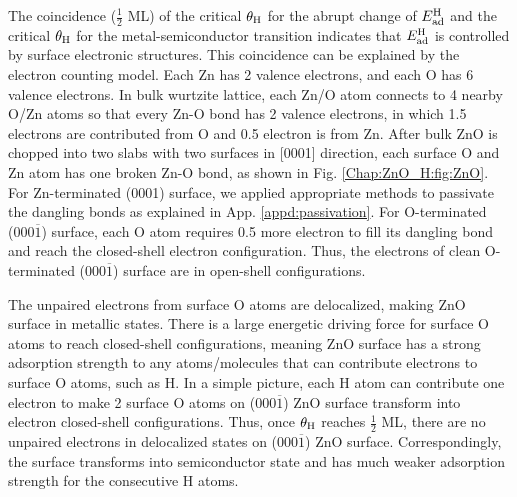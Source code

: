 The coincidence ($\frac{1}{2}$ ML) of the critical $\theta_{\textup{H}}$ for the abrupt change of $E_{\textup{ad}}^{\textup{H}}$ and the critical $\theta_{\textup{H}}$ for the metal-semiconductor transition indicates that $E_{\textup{ad}}^{\textup{H}}$ is controlled by surface electronic structures. This coincidence can be explained by the electron counting model\cite{pashley1989electron}. Each Zn has 2 valence electrons, and each O has 6 valence electrons. In bulk wurtzite lattice, each Zn/O atom connects to 4 nearby O/Zn atoms so that every Zn-O bond has 2 valence electrons, in which 1.5 electrons are contributed from O and 0.5 electron is from Zn. After bulk ZnO is chopped into two slabs with two surfaces in [0001] direction, each surface O and Zn atom has one broken Zn-O bond, as shown in Fig. \ref{Chap:ZnO_H:fig:ZnO}. For Zn-terminated (0001) surface, we applied appropriate methods to passivate the dangling bonds as explained in App. \ref{appd:passivation}. For O-terminated (000$\overline{1}$) surface, each O atom requires 0.5 more electron to fill its dangling bond and reach the closed-shell electron configuration. Thus, the electrons of clean O-terminated (000$\overline{1}$) surface are in open-shell configurations. 

The unpaired electrons from surface O atoms are delocalized, making ZnO surface in metallic states. There is a large energetic driving force for surface O atoms to reach closed-shell configurations, meaning ZnO surface has a strong adsorption strength to any atoms/molecules that can contribute electrons to surface O atoms, such as H. In a simple picture, each H atom can contribute one electron to make 2 surface O atoms on (000$\overline{1}$) ZnO surface transform into electron closed-shell configurations. Thus, once $\theta_{\textup{H}}$ reaches $\frac{1}{2}$ ML, there are no unpaired electrons in delocalized states on (000$\overline{1}$) ZnO surface. Correspondingly, the surface transforms into semiconductor state and has much weaker adsorption strength for the consecutive H atoms.

